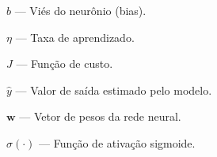 \begin{simbolos}

    $b$ --- Viés do neurônio (bias).

    $\eta$ --- Taxa de aprendizado.

    $J$ --- Função de custo.

    $\hat{y}$ --- Valor de saída estimado pelo modelo.

    $\mathbf{w}$ --- Vetor de pesos da rede neural.

    $\sigma(\cdot)$ --- Função de ativação sigmoide.

\end{simbolos}
